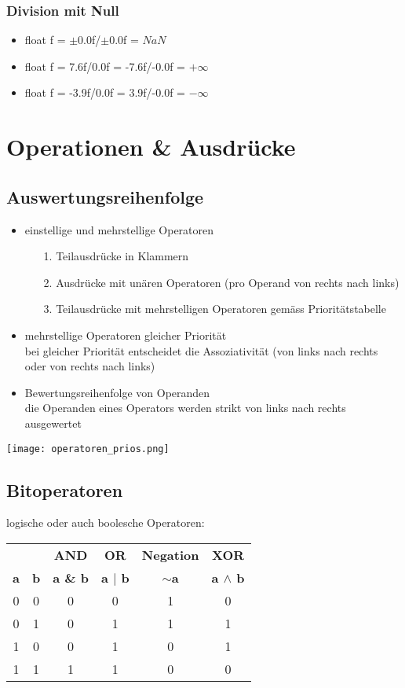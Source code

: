 \documentclass[a4paper,10pt]{article}
\newcommand{\Bold}[1]{\textbf{#1}} %
\begin{document}
\subsubsection{Division mit Null}
\begin{itemize}
	\item float f = $\pm$0.0f/$\pm$0.0f = $NaN$
	\item float f = 7.6f/0.0f = -7.6f/-0.0f = $+\infty$
	\item float f = -3.9f/0.0f = 3.9f/-0.0f = $-\infty$
\end{itemize}

\newpage
\section{Operationen \& Ausdr\"ucke}

\subsection{Auswertungsreihenfolge}
\begin{itemize}
	\item einstellige und mehrstellige Operatoren
		\begin{itemize}
			\item[1.] Teilausdr\"ucke in Klammern
			\item[2.] Ausdr\"ucke mit un\"aren Operatoren (pro Operand von rechts nach links)
			\item[3.] Teilausdr\"ucke mit mehrstelligen Operatoren gem\"ass Priorit\"atstabelle
		\end{itemize}
	\item mehrstellige Operatoren gleicher Priorit\"at \\
		bei gleicher Priorit\"at entscheidet die Assoziativit\"at (von links nach rechts oder von rechts nach links)
	\item Bewertungsreihenfolge von Operanden \\
		die Operanden eines Operators werden strikt von links nach rechts ausgewertet
\end{itemize}
\texttt{[image: operatoren\_prios.png]}

\subsection{Bitoperatoren}
logische oder auch boolesche Operatoren: \\
\begin{tabular}{|c|c|c|c|c|c|}
	\hline
	& & \Bold {AND} & \Bold {OR} & \Bold {Negation} & \Bold {XOR} \\
	\Bold {a} & \Bold {b} & \Bold {a \& b} & \Bold {a $|$ b} & \Bold {$\sim$a} & \Bold {a $\wedge$  b} \\
	\hline
	0 & 0 & 0 & 0 & 1 & 0 \\
	0 & 1 & 0 & 1 & 1 & 1 \\
	1 & 0 & 0 & 1 & 0 & 1 \\
	1 & 1 & 1 & 1 & 0 & 0 \\
	\hline
\end{tabular}
\end{document}
